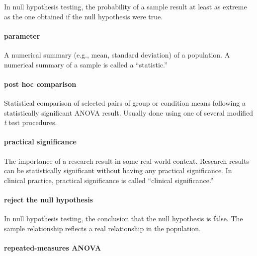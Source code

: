 \documentclass[
]{krantz}
\begin{document}
In null hypothesis testing, the probability of a sample result at least as extreme as the one obtained if the null hypothesis were true.

\hypertarget{parameter}{%
\paragraph*{parameter}\label{parameter}}

A numerical summary (e.g., mean, standard deviation) of a population. A numerical summary of a sample is called a ``statistic.''

\hypertarget{post-hoc-comparison}{%
\paragraph*{post hoc comparison}\label{post-hoc-comparison}}

Statistical comparison of selected pairs of group or condition means following a statistically significant ANOVA result. Usually done using one of several modified \emph{t} test procedures.

\hypertarget{practical-significance}{%
\paragraph*{practical significance}\label{practical-significance}}

The importance of a research result in some real-world context. Research results can be statistically significant without having any practical significance. In clinical practice, practical significance is called ``clinical significance.''

\hypertarget{reject-the-null-hypothesis}{%
\paragraph*{reject the null hypothesis}\label{reject-the-null-hypothesis}}

In null hypothesis testing, the conclusion that the null hypothesis is false. The sample relationship reflects a real relationship in the population.

\hypertarget{repeated-measures-anova-1}{%
\paragraph*{repeated-measures ANOVA}\label{repeated-measures-anova-1}}
\end{document}
